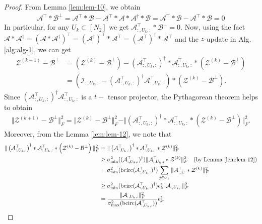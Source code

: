 \documentclass[11pt]{article}
\def\fm#1{\mathcal{#1}}
\def \a#1{\fm A_{:, #1, :}}
\begin{document}
\begin{proof}
From Lemma \ref{lem:lem-10}, we obtain 
\begin{align*}
    \fm A^\top *\fm B^\perp  =\fm A^\top  *\fm B - \fm A^\top * \fm A * \fm A^\dagger * \fm B =\fm A ^\top * \fm B  - \fm A ^\top * \fm B = 0
\end{align*}
In particular, for any $U_k \subset [N_2]$   we get $\fm A_{:, U_k, :}^\top *\fm B^\perp = 0$.
Now, using the fact $\fm A * \fm A^\dagger = \left(\fm A * \fm  A^\dagger \right)^\top = (\fm A^\dagger)^\top * \fm A ^\top = (\fm A^\top )^\dagger * \fm A^\top   $  and the $z$-update in Alg. \ref{alg:alg-1}, we can get
\begin{align*}
    \fm Z^{(k+1)} - \fm B^\perp  & = \left(\fm Z^{(k)} - \fm B^\perp\right) - \left(\fm A^\top_{:, {U_k}, :} \right)^\dagger* \fm A^\top_{:, U_k, :} *\left( \fm Z ^{(k)}-\fm B^\perp \right)\\
    & = \left(\fm I_{:, U_k, :} - \left( \a{U_k}^\top\right) ^\dagger \a{U_k}^\top\right)*\left( \fm Z^{(k)}- \fm B^\perp \right).
\end{align*}
Since $\left( \a{U_k}^\top\right) ^\dagger \a{U_k}^\top$  is a $t-$ tensor projector,  the Pythagorean theorem helps to obtain
\begin{align}
    \Vert   \fm Z^{(k+1)} - \fm B^\perp  \Vert_F^2  = \Vert  \fm Z^{(k)} - \fm B^\perp  \Vert_F^2 - \Vert  \left(\fm A^\top_{:, {U_k}, :} \right)^\dagger* \fm A^\top_{:, U_k, :} *\left( \fm Z ^{(k)}-\fm B^\perp \right) \Vert_F^2. \label{eq:eq-1b}
\end{align}
Moreover, from the Lemma \ref{lem:lem-12}, we  note that 
\begin{align}
    \Vert \left(\a{U_k}^\top \right)^\dagger * \a{U_k}^\top *\left(\fm Z^{(k)}-\fm B^\perp \right) \Vert_F^2 & =  \Vert \left(\a{U_k}^\top \right)^\dagger * \a{U_k}^\top *\fm Z^{(k)}\Vert_F^2 \notag\\
    & \geq \sigma_{\min}^2((\a{U_k}^\top) ^\dagger)\Vert \a{U_k}^\top * \fm Z^{(k)} \Vert_F^2 
  \quad \text{(by Lemma \ref{lem:lem-12})} \notag\\
    & = \sigma_{\min}^2(\bcirc(\a{U_k}^\top) ^\dagger) \sum_{j\in U_k} \Vert \a j ^\top * \fm Z^{(k)} \Vert_F^2 \notag\\
    & \geq \sigma_{\min}^2(\bcirc(\a{U_k}^\top) ^\dagger) \epsilon^z_k \Vert \a{U_k} \Vert_F^2 \notag\\
    & =  \frac{\Vert \a{U_k} \Vert_F^2}{\sigma_{\max}^2(\bcirc(\a{U_k}^\top))} \epsilon_k^z .\label{eq:eq-2}
\end{align}

\end{proof}
\end{document}
